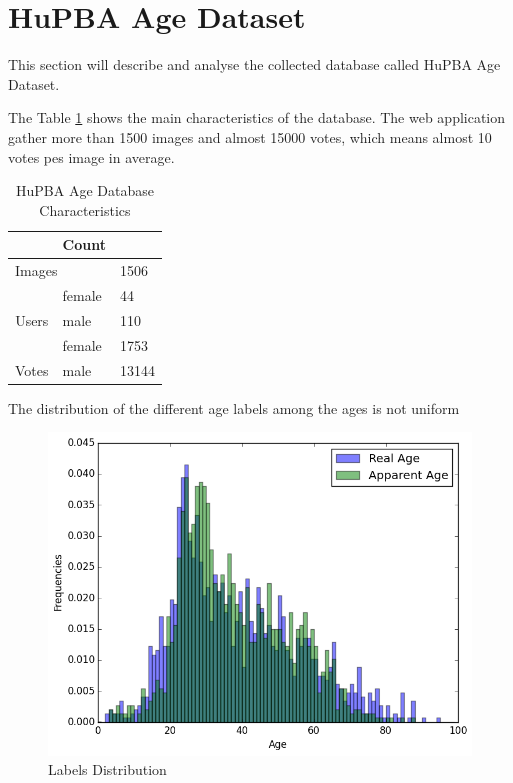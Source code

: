 \section{HuPBA Age Dataset}

This section will describe and analyse the collected database called HuPBA Age Dataset.

The Table \ref{tab:charact} shows the main characteristics of the database. The web application gather more than 1500 images and almost 15000 votes, which means almost 10 votes pes image in average.

\begin{table}[h]
	\centering
	\begin{tabular}{|c|l|l|}
		\rowcolor[HTML]{EFEFEF} 
		\hline
		\multicolumn{2}{|l|}{\cellcolor[HTML]{EFEFEF}\textbf{Features}} & Count \\ \hline
		\multicolumn{2}{|l|}{Images}                                    & 1506  \\ \hline
		& female                & 44    \\ \cline{2-3} 
		\multirow{-2}{*}{Users}                 & male                  & 110   \\ \hline
		& female                & 1753  \\ \cline{2-3} 
		\multirow{-2}{*}{Votes}                 & male                  & 13144 \\ \hline
	\end{tabular}
	\caption{HuPBA Age Database Characteristics}
	\label{tab:charact}
\end{table}
	
The distribution of the different age labels among the ages is not uniform

\begin{figure}[h!]
	\centering
	\includegraphics[width=\textwidth]{figures/Label_Distribution.png}
	\caption{Labels Distribution}
	\label{fig:distr}
\end{figure}
 
